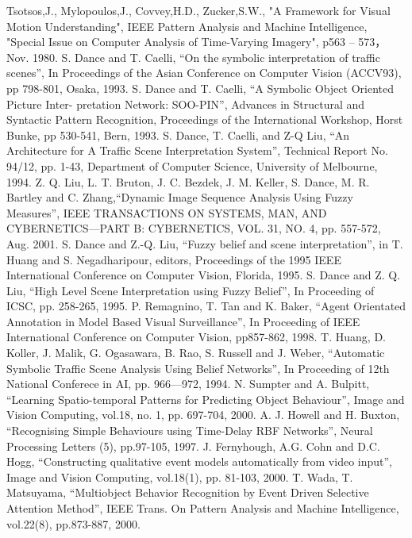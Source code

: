 \begin{thebibliography}{200}
 Tsotsos,J., Mylopoulos,J., Covvey,H.D., Zucker,S.W., "A Framework for Visual Motion Understanding", IEEE Pattern Analysis and Machine Intelligence, "Special Issue on Computer Analysis of Time-Varying Imagery", p563 -- 573， Nov. 1980.
 S. Dance and T. Caelli, ``On the symbolic interpretation of traffic scenes'', In Proceedings of the Asian Conference on Computer Vision (ACCV93), pp 798-801, Osaka, 1993.
 S. Dance and T. Caelli, “A Symbolic Object Oriented Picture Inter- pretation Network: SOO-PIN”, Advances in Structural and Syntactic Pattern Recognition, Proceedings of the International Workshop, Horst Bunke, pp 530-541, Bern, 1993.
 S. Dance, T. Caelli, and Z-Q Liu, “An Architecture for A Traffic Scene Interpretation System”, Technical Report No. 94/12, pp. 1-43, Department of Computer Science, University of Melbourne, 1994.
 Z. Q. Liu, L. T. Bruton, J. C. Bezdek, J. M. Keller, S. Dance, M. R. Bartley and C. Zhang,``Dynamic Image Sequence Analysis Using Fuzzy Measures'', IEEE TRANSACTIONS ON SYSTEMS, MAN, AND CYBERNETICS---PART B: CYBERNETICS, VOL. 31, NO. 4, pp. 557-572, Aug. 2001.
 S. Dance and Z.-Q. Liu, ``Fuzzy belief and scene interpretation'', in T. Huang and S. Negadharipour, editors, Proceedings of the 1995 IEEE International Conference on Computer Vision, Florida, 1995.
 S. Dance and Z. Q. Liu, ``High Level Scene Interpretation using Fuzzy Belief'', In Proceeding of ICSC, pp. 258-265, 1995.
 P. Remagnino, T. Tan and K. Baker, “Agent Orientated Annotation in Model Based Visual Surveillance”, In Proceeding of IEEE International Conference on Computer Vision, pp857-862, 1998.
 T. Huang, D. Koller, J. Malik, G. Ogasawara, B. Rao, S. Russell and J. Weber, ``Automatic Symbolic Traffic Scene Analysis Using Belief Networks'', In Proceeding of 12th National Conferece in AI, pp. 966---972, 1994.
 N. Sumpter and A. Bulpitt, ``Learning Spatio-temporal Patterns for Predicting Object Behaviour'', Image and Vision Computing, vol.18, no. 1, pp. 697-704, 2000.
 A. J. Howell and H. Buxton, ``Recognising Simple Behaviours using Time-Delay RBF Networks'', Neural Processing Letters (5), pp.97-105, 1997.
 J. Fernyhough, A.G. Cohn and D.C. Hogg, ``Constructing qualitative event models automatically from video input'', Image and Vision Computing, vol.18(1), pp. 81-103, 2000.
 T. Wada, T. Matsuyama, ``Multiobject Behavior Recognition by Event Driven Selective Attention Method'', IEEE Trans. On Pattern Analysis and Machine Intelligence, vol.22(8), pp.873-887, 2000.

\end{thebibliography}
